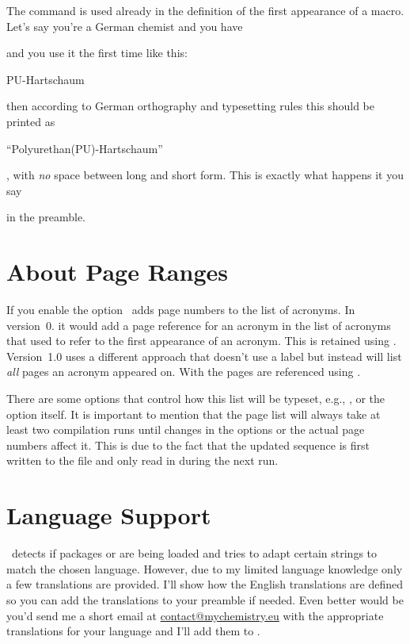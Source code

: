 \documentclass[load-preamble+]{cnltx-doc}
\makeatletter
\newcommand\versionstar{\texorpdfstring{\@versionstar}{*}}
\makeatother
\begin{document}
The command  is used already in the definition of the first
appearance of a macro.  Let's say you're a German chemist and you have
\begin{sourcecode}
\end{sourcecode}
and you use it the first time like this:
\begin{sourcecode}
  \ac{PU}-Hartschaum
\end{sourcecode}
then according to German orthography and typesetting rules this should be
printed as
\begin{center}
  \enquote{Polyurethan(PU)-Hartschaum}
\end{center}
\ie, with \emph{no} space between long and short form.  This is exactly what
happens it you say
\begin{sourcecode}
\end{sourcecode}
in the preamble.

\section{About Page Ranges}
If you enable the  option \acro\ adds page numbers to the list
of acronyms.  In version~0.\versionstar{} it would add a page reference for an
acronym in the list of acronyms that used  to refer to the first
appearance of an acronym.  This is retained using .
Version~1.0 uses a different approach that doesn't use a label but instead
will list \emph{all} pages an acronym appeared on.  With  the
pages are referenced using .

There are some options that control how this list will be typeset, e.g.,
,  or the option 
itself.  It is important to mention that the page list will always take at
least two compilation runs until changes in the options or the actual page
numbers affect it.  This is due to the fact that the updated sequence is first
written to the  file and only read in during the next run.


\section{Language Support}
\acro\ detects if packages  or  are being loaded
and tries to adapt certain strings to match the chosen language.  However, due
to my limited language knowledge only a few translations are provided.  I'll
show how the English translations are defined so you can add the translations
to your preamble if needed.  Even better would be you'd send me a short email
at \href{mailto:contact@mychemistry.eu}{contact@mychemistry.eu} with the
appropriate translations for your language and I'll add them to \acro.
\end{document}
